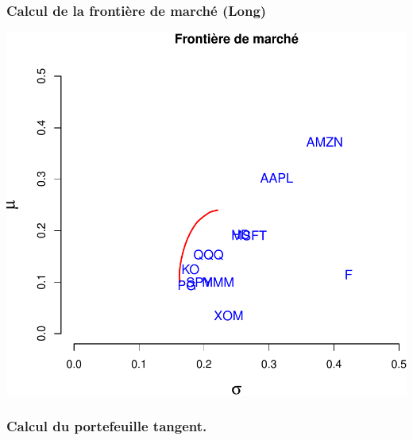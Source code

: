 \documentclass[
]{article}
\begin{document}
\hypertarget{calcul-de-la-frontiuxe8re-de-marchuxe9-long-1}{%
\subsubsection{Calcul de la frontière de marché
(Long)}\label{calcul-de-la-frontiuxe8re-de-marchuxe9-long-1}}

\includegraphics{TP-2_files/figure-latex/unnamed-chunk-12-1.pdf}

\hypertarget{calcul-du-portefeuille-tangent.}{%
\subsubsection{Calcul du portefeuille
tangent.}\label{calcul-du-portefeuille-tangent.}}
\end{document}
